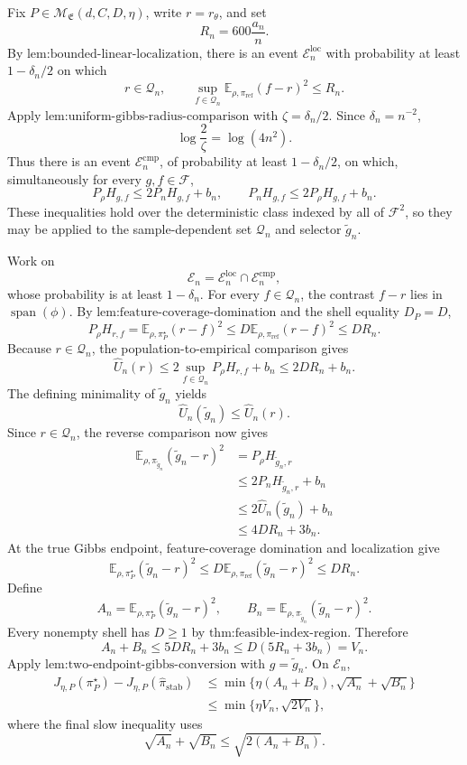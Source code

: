 Fix \(P\in\mathcal M_{\mathfrak E}(d,C,D,\eta)\), write \(r=r_\theta\), and set
\[
R_n=600\frac{a_n}{n}.
\]
By \(\text{lem:bounded-linear-localization}\), there is an event \(\mathcal E_n^{\mathrm{loc}}\) with probability at least \(1-\delta_n/2\) on which
\[
r\in\mathcal Q_n,
\qquad
\sup_{f\in\mathcal Q_n}
\mathbb E_{\rho,\pi_{\mathrm{ref}}}(f-r)^2
\le R_n.
\]
Apply \(\text{lem:uniform-gibbs-radius-comparison}\) with \(\zeta=\delta_n/2\). Since \(\delta_n=n^{-2}\),
\[
\log\frac2\zeta=\log(4n^2).
\]
Thus there is an event \(\mathcal E_n^{\mathrm{cmp}}\), of probability at least \(1-\delta_n/2\), on which, simultaneously for every \(g,f\in\mathcal F\),
\[
P_\rho H_{g,f}\le2P_nH_{g,f}+b_n,
\qquad
P_nH_{g,f}\le2P_\rho H_{g,f}+b_n.
\]
These inequalities hold over the deterministic class indexed by all of \(\mathcal F^2\), so they may be applied to the sample-dependent set \(\mathcal Q_n\) and selector \(\widetilde g_n\).

Work on
\[
\mathcal E_n=\mathcal E_n^{\mathrm{loc}}\cap\mathcal E_n^{\mathrm{cmp}},
\]
whose probability is at least \(1-\delta_n\). For every \(f\in\mathcal Q_n\), the contrast \(f-r\) lies in \(\operatorname{span}(\phi)\). By \(\text{lem:feature-coverage-domination}\) and the shell equality \(D_P=D\),
\[
P_\rho H_{r,f}
=\mathbb E_{\rho,\pi_P^\star}(r-f)^2
\le D\mathbb E_{\rho,\pi_{\mathrm{ref}}}(r-f)^2
\le DR_n.
\]
Because \(r\in\mathcal Q_n\), the population-to-empirical comparison gives
\[
\widehat U_n(r)
\le2\sup_{f\in\mathcal Q_n}P_\rho H_{r,f}+b_n
\le2DR_n+b_n.
\]
The defining minimality of \(\widetilde g_n\) yields
\[
\widehat U_n(\widetilde g_n)\le\widehat U_n(r).
\]
Since \(r\in\mathcal Q_n\), the reverse comparison now gives
\[
\begin{aligned}
\mathbb E_{\rho,\pi_{\widetilde g_n}}
(\widetilde g_n-r)^2
&=P_\rho H_{\widetilde g_n,r}\\
&\le2P_nH_{\widetilde g_n,r}+b_n\\
&\le2\widehat U_n(\widetilde g_n)+b_n\\
&\le4DR_n+3b_n.
\end{aligned}
\]
At the true Gibbs endpoint, feature-coverage domination and localization give
\[
\mathbb E_{\rho,\pi_P^\star}
(\widetilde g_n-r)^2
\le
D\mathbb E_{\rho,\pi_{\mathrm{ref}}}
(\widetilde g_n-r)^2
\le DR_n.
\]
Define
\[
A_n=\mathbb E_{\rho,\pi_P^\star}
(\widetilde g_n-r)^2,
\qquad
B_n=\mathbb E_{\rho,\pi_{\widetilde g_n}}
(\widetilde g_n-r)^2.
\]
Every nonempty shell has \(D\ge1\) by \(\text{thm:feasible-index-region}\). Therefore
\[
A_n+B_n
\le5DR_n+3b_n
\le D(5R_n+3b_n)
=V_n.
\]
Apply \(\text{lem:two-endpoint-gibbs-conversion}\) with \(g=\widetilde g_n\). On \(\mathcal E_n\),
\[
\begin{aligned}
J_{\eta,P}(\pi_P^\star)
-J_{\eta,P}(\widehat\pi_{\mathrm{stab}})
&\le
\min\{\eta(A_n+B_n),\sqrt{A_n}+\sqrt{B_n}\}\\
&\le
\min\{\eta V_n,\sqrt{2V_n}\},
\end{aligned}
\]
where the final slow inequality uses
\[
\sqrt{A_n}+\sqrt{B_n}
\le\sqrt{2(A_n+B_n)}.
\]

